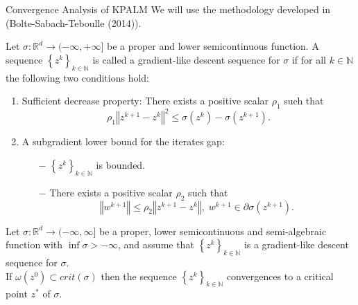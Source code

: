\documentclass[9pt]{beamer}
\newcommand{\nn}{\mathbb{N}} %
\newcommand{\rr}{\mathbb{R}} %
\newcommand{\norm}[1]{\left\Vert {#1} \right\Vert} %
\begin{document}
	\begin{frame}{Convergence Analysis of KPALM}
		We will use the methodology developed in {\dblue (Bolte-Sabach-Teboulle (2014))}.
		\begin{definition} \label{gradient_like_seq_def}
			Let $\sigma: \rr^d \rightarrow (-\infty, +\infty]$ be a proper and lower semicontinuous function. A sequence $\left\lbrace z^k \right\rbrace_{k \in \nn}$ is called a {\dblue gradient-like descent sequence} for $\sigma$ if for all $k \in \nn$ the following two conditions hold:
			\begin{enumerate}[(C1)]
				\item {\dblue Sufficient decrease property}: There exists a positive scalar $\rho_1$ such that
				\begin{equation*}
					\rho_1 \norm{z^{k+1} - z^k}^2 \leq \sigma\left( z^k \right) - \sigma \left( z^{k+1} \right) .
				\end{equation*}
				\item {\dblue A subgradient lower bound for the iterates gap}:
				\begin{itemize}
					\item[$-$] $\left\lbrace z^k \right\rbrace_{k \in \nn}$ is bounded.
					\item[$-$] There exists a positive scalar $\rho_2$ such that
					\begin{equation*}
						\norm{w^{k+1}} \leq \rho_2 \norm{z^{k+1} - z^k}, \; w^{k+1} \in \partial\sigma \left( z^{k+1}\right).
					\end{equation*}
				\end{itemize}
			\end{enumerate}
		\end{definition}
		\pause
		\begin{theorem} \label{SDP_SGP_conv_thrm}
			Let $\sigma:\rr^d \rightarrow (-\infty,\infty]$ be a proper, lower semicontinuous and semi-algebraic function with $\inf \sigma > -\infty$, and assume that $\left\lbrace z^k \right\rbrace_{k \in \nn}$ is a gradient-like descent sequence for $\sigma$. \\ If $\omega\left( z^0 \right) \subset crit(\sigma)$ then the sequence $\left\lbrace z^k \right\rbrace_{k \in \nn}$ convergences to a critical point $z^{*}$ of $\sigma$.
		\end{theorem}
	\end{frame}
	
\end{document}
